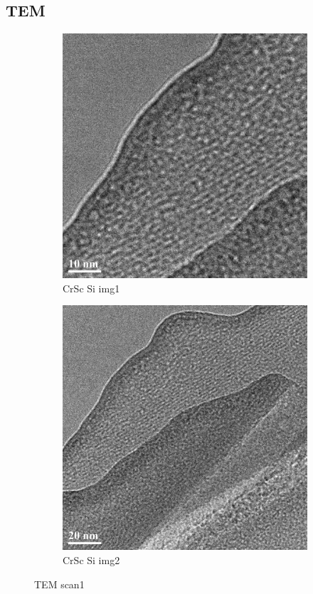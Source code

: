 \subsection{TEM}
\begin{figure}[h!]
	\centering
	\begin{subfigure}[b]{0.45\textwidth}
		\includegraphics[width=\textwidth]{./Images/TEM/CrSc_Si_img1}
		\caption{CrSc Si img1}
		\label{fig:CrSc_Si_img1}
	\end{subfigure}
	\begin{subfigure}[b]{0.45\textwidth}
		\includegraphics[width=\textwidth]{./Images/TEM/CrSc_Si_img2}
		\caption{CrSc Si img2}
		\label{fig:CrSc_Si_img2}
	\end{subfigure}
	\caption{TEM scan1}
	\label{fig:TEM scan1}
\end{figure}

